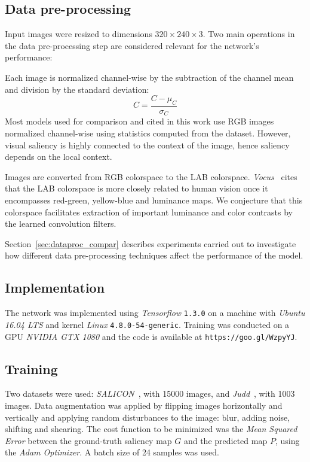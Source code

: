 \documentclass[10pt,twocolumn,letterpaper]{article}
\begin{document}
\subsection{Data pre-processing}
Input images were resized to dimensions $320\times240\times3$.
Two main operations in the data pre-processing step are considered
relevant for the network's performance:

Each image is normalized channel-wise by the subtraction of
the channel mean and division by the standard deviation:
$$C = \frac{C - \mu_C}{\sigma_C}$$
Most models used for comparison and cited in this work use RGB images
normalized channel-wise using statistics computed from the dataset.
However, visual saliency is highly connected to the context of the
image, hence saliency depends on the local context.

Images are converted from RGB colorspace to the LAB colorspace.
\emph{Vocus}~\cite{frintrop_2005} cites that the
LAB colorspace is more closely related to human vision once it encompasses
red-green, yellow-blue and
luminance maps.
We conjecture that this colorspace facilitates extraction of
important luminance and color contrasts by the learned convolution filters.

Section~\ref{sec:dataproc_compar} describes experiments carried out
to investigate how different data pre-processing techniques affect the
performance of the model.

\subsection{Implementation}
The network was implemented using \emph{Tensorflow} \texttt{1.3.0}
on a machine with \emph{Ubuntu 16.04 LTS} and
kernel \emph{Linux} \texttt{4.8.0-54-generic}.
Training was conducted on a GPU \emph{NVIDIA GTX 1080} and the
code is available at \texttt{https://goo.gl/WzpyYJ}.

\subsection{Training}
Two datasets were used:
\emph{SALICON}~\cite{jiang_2015}, with 15000 images, and
\emph{Judd}~\cite{judd}, with 1003 images.
Data augmentation was applied by flipping images
horizontally and vertically and applying random disturbances to the image:
blur, adding noise, shifting and shearing.
The cost function to be minimized was the \emph{Mean Squared Error} between
the ground-truth saliency map $G$ and the predicted map $P$, using
the \emph{Adam Optimizer}.
A batch size of 24 samples was used.
\end{document}
